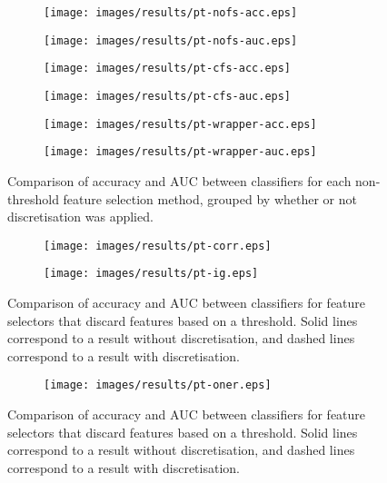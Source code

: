 \begin{figure}[htbp]
\begin{subfigure}{.48\textwidth}
\texttt{[image: images/results/pt-nofs-acc.eps]}
\caption{}
\label{}
\end{subfigure}%
\begin{subfigure}{.55\textwidth}
\texttt{[image: images/results/pt-nofs-auc.eps]}
\caption{}
\label{}
\end{subfigure}

\begin{subfigure}{.48\textwidth}
\texttt{[image: images/results/pt-cfs-acc.eps]}
\caption{}
\label{}
\end{subfigure}%
\begin{subfigure}{.55\textwidth}
\texttt{[image: images/results/pt-cfs-auc.eps]}
\caption{}
\label{}
\end{subfigure}

\begin{subfigure}{.48\textwidth}
\texttt{[image: images/results/pt-wrapper-acc.eps]}
\caption{}
\label{}
\end{subfigure}%
\begin{subfigure}{.55\textwidth}
\texttt{[image: images/results/pt-wrapper-auc.eps]}
\caption{}
\label{}
\end{subfigure}
\caption{Comparison of accuracy and AUC between classifiers for each non-threshold feature selection method, grouped by whether or not discretisation was applied.}
\label{fig:pt-nothreshold}
\end{figure}

\begin{figure}[htbp]
\begin{subfigure}{\textwidth}
\texttt{[image: images/results/pt-corr.eps]}
\caption{}
\label{fig:pt-threshold-corr}
\end{subfigure}
\ContinuedFloat
\begin{subfigure}{\textwidth}
\texttt{[image: images/results/pt-ig.eps]}
\caption{}
\label{}
\end{subfigure}
\caption{Comparison of accuracy and AUC between classifiers for feature selectors that discard features based on a threshold. Solid lines correspond to a result without discretisation, and dashed lines correspond to a result with discretisation.}
\label{fig:pt-threshold}
\end{figure}

\begin{figure}[htbp]
\ContinuedFloat
\begin{subfigure}{\textwidth}
\texttt{[image: images/results/pt-oner.eps]}
\caption{}
\label{}
\end{subfigure}
\caption[]{Comparison of accuracy and AUC between classifiers for feature selectors that discard features based on a threshold. Solid lines correspond to a result without discretisation, and dashed lines correspond to a result with discretisation.}
\end{figure}

